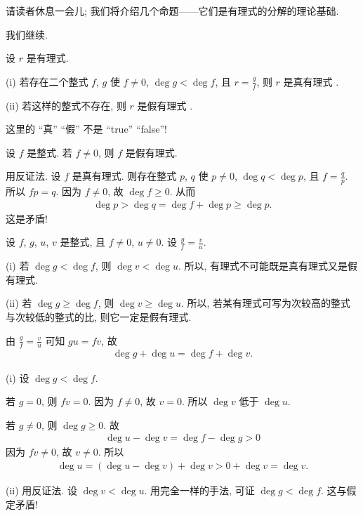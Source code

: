 请读者休息一会{\scriptsize 儿}; 我们将介绍几个命题——它们是有理式的分解的理论基础.

\myLine

我们继续.

\begin{definition}
    设 $r$ 是有理式.

    (i) 若存在二个整式 $f$, $g$ 使 $f \neq 0$, $\deg g < \deg f$, 且 $r = \frac{g}{f}$, 则 $r$ 是真有理式 .

    (ii) 若这样的整式不存在, 则 $r$ 是假有理式 .
\end{definition}

\begin{remark}
    这里的 ``真'' ``假'' 不是 ``true'' ``false''!
\end{remark}

\begin{example}
    设 $f$ 是整式. 若 $f \neq 0$, 则 $f$ 是假有理式.

    用反证法. 设 $f$ 是真有理式. 则存在整式 $p$, $q$ 使 $p \neq 0$, $\deg q < \deg p$, 且 $f = \frac{q}{p}$. 所以 $fp = q$. 因为 $f \neq 0$, 故 $\deg f \geq 0$. 从而
    \begin{align*}
        \deg p > \deg q = \deg f + \deg p \geq \deg p.
    \end{align*}
    这是矛盾!
\end{example}

\begin{proposition}
    设 $f$, $g$, $u$, $v$ 是整式, 且 $f \neq 0$, $u \neq 0$. 设 $\frac{g}{f} = \frac{v}{u}$.

    (i) 若 $\deg g < \deg f$, 则 $\deg v < \deg u$. 所以, 有理式不可能既是真有理式又是假有理式.

    (ii) 若 $\deg g \geq \deg f$, 则 $\deg v \geq \deg u$. 所以, 若某有理式可写为次较高的整式与次较低的整式的比, 则它一定是假有理式.
\end{proposition}

\begin{pf}
    由 $\frac{g}{f} = \frac{v}{u}$ 可知 $gu = fv$, 故
    \begin{align*}
        \deg g + \deg u = \deg f + \deg v.
    \end{align*}

    (i) 设 $\deg g < \deg f$.

    若 $g = 0$, 则 $fv = 0$. 因为 $f \neq 0$, 故 $v = 0$. 所以 $\deg v$ 低于 $\deg u$.

    若 $g \neq 0$, 则 $\deg g \geq 0$. 故
    \begin{align*}
        \deg u - \deg v = \deg f - \deg g > 0
    \end{align*}
    因为 $fv \neq 0$, 故 $v \neq 0$. 所以
    \begin{align*}
        \deg u = (\deg u - \deg v) + \deg v > 0 + \deg v = \deg v.
    \end{align*}

    (ii) 用反证法. 设 $\deg v < \deg u$. 用完全一样的手法, 可证 $\deg g < \deg f$. 这与假定矛盾!
\end{pf}

